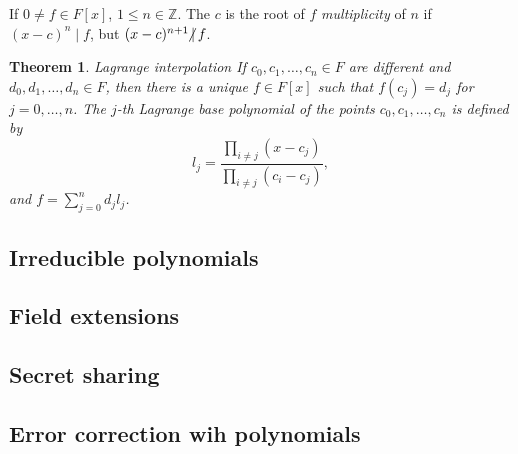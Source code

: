 \documentclass{article}
\newcommand{\Z}{\mathbb{Z}}
\newcommand{\nmid}{\hspace{-4pt}\not|\hspace{2pt}}
\newtheorem{theorem}{Theorem}
\begin{document}
If $0 \neq f \in F[x]$, $1 \le n \in \Z$. The $c$ is the root of $f$ \emph{multiplicity} of $n$ if $(x-c)^n \mid f$, but $(x-c)^{n+1} \nmid f$.

\begin{theorem}{Lagrange interpolation}
    If $c_0,c_1,\ldots,c_n \in F$ are different and $d_0,d_1,\ldots,d_n \in F$, then there is a unique $f\in F[x]$ such that $f(c_j) = d_j$ for $j=0,\ldots,n$.
    The $j$-th Lagrange base polynomial of the points $c_0,c_1,\ldots,c_n$ is defined by
    \[
        l_j = \frac{\prod_{i \neq j} (x - c_j)}{\prod_{i \neq j} (c_i - c_j)},
    \]
    and $f = \sum_{j=0}^n d_j l_j$.
\end{theorem}
\subsection{Irreducible polynomials}
\subsection{Field extensions}
\subsection{Secret sharing}
\subsection{Error correction wih polynomials}
\end{document}
